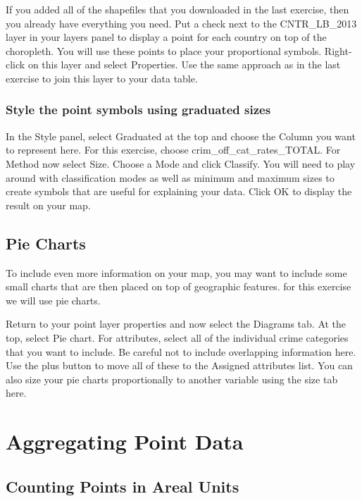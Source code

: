 \documentclass[]{book}
\begin{document}
If you added all of the shapefiles that you downloaded in the last exercise, then you already have everything you need. Put a check next to the CNTR\_LB\_2013 layer in your layers panel to display a point for each country on top of the choropleth. You will use these points to place your proportional symbols. Right-click on this layer and select Properties. Use the same approach as in the last exercise to join this layer to your data table.

\hypertarget{style-the-point-symbols-using-graduated-sizes}{%
\subsection{Style the point symbols using graduated sizes}\label{style-the-point-symbols-using-graduated-sizes}}

In the Style panel, select Graduated at the top and choose the Column you want to represent here. For this exercise, choose crim\_off\_cat\_rates\_TOTAL. For Method now select Size. Choose a Mode and click Classify. You will need to play around with classification modes as well as minimum and maximum sizes to create symbols that are useful for explaining your data. Click OK to display the result on your map.

\hypertarget{pie-charts}{%
\section{Pie Charts}\label{pie-charts}}

To include even more information on your map, you may want to include some small charts that are then placed on top of geographic features. for this exercise we will use pie charts.

Return to your point layer properties and now select the Diagrams tab. At the top, select Pie chart. For attributes, select all of the individual crime categories that you want to include. Be careful not to include overlapping information here. Use the plus button to move all of these to the Assigned attributes list. You can also size your pie charts proportionally to another variable using the size tab here.

\hypertarget{aggregating-point-data}{%
\chapter{Aggregating Point Data}\label{aggregating-point-data}}

\hypertarget{counting-points-in-areal-units}{%
\section{Counting Points in Areal Units}\label{counting-points-in-areal-units}}
\end{document}

